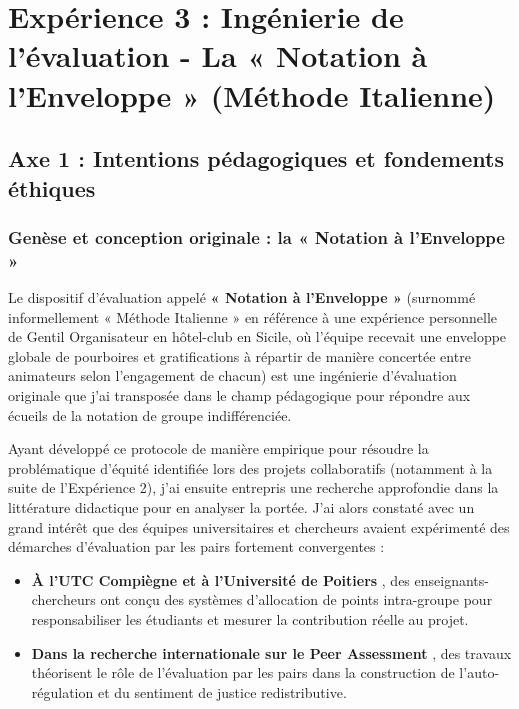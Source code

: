 \chapter{Expérience 3 : Ingénierie de l'évaluation - La « Notation à l'Enveloppe » (Méthode Italienne)}

\section{Axe 1 : Intentions pédagogiques et fondements éthiques}

\subsection{Genèse et conception originale : la « Notation à l'Enveloppe »}

Le dispositif d'évaluation appelé \textbf{« Notation à l'Enveloppe »} (surnommé informellement « Méthode Italienne » en référence à une expérience personnelle de Gentil Organisateur en hôtel-club en Sicile, où l'équipe recevait une enveloppe globale de pourboires et gratifications à répartir de manière concertée entre animateurs selon l'engagement de chacun) est une ingénierie d'évaluation originale que j'ai transposée dans le champ pédagogique pour répondre aux écueils de la notation de groupe indifférenciée.

Ayant développé ce protocole de manière empirique pour résoudre la problématique d'équité identifiée lors des projets collaboratifs (notamment à la suite de l'Expérience 2), j'ai ensuite entrepris une recherche approfondie dans la littérature didactique pour en analyser la portée. J'ai alors constaté avec un grand intérêt que des équipes universitaires et chercheurs avaient expérimenté des démarches d'évaluation par les pairs fortement convergentes :
\begin{itemize}[leftmargin=*]
    \item \textbf{À l'UTC Compiègne et à l'Université de Poitiers} \parencite{evaluation_pairs_utc,evaluation_pairs_univ_poitiers}, des enseignants-chercheurs ont conçu des systèmes d'allocation de points intra-groupe pour responsabiliser les étudiants et mesurer la contribution réelle au projet.
    \item \textbf{Dans la recherche internationale sur le Peer Assessment} \parencite{topping_peer_assessment,scallon_evaluation}, des travaux théorisent le rôle de l'évaluation par les pairs dans la construction de l'auto-régulation et du sentiment de justice redistributive.
\end{itemize}

